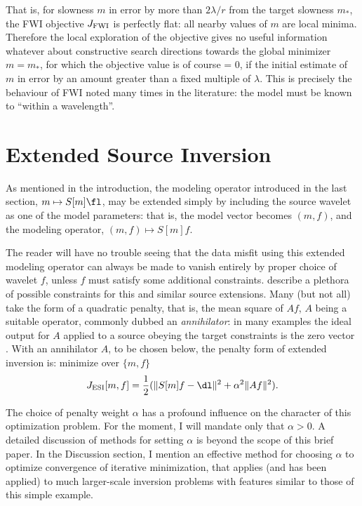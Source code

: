 That is, for slowness $m$ in error by more than $2\lambda/r$ from the
target slowness $m_*$, the FWI objective $J_{\rm FWI}$ is perfectly
flat: all nearby values of $m$ are local minima. Therefore the local
exploration of the objective
gives no useful information whatever about constructive search
directions towards the global minimizer $m=m_*$, for which the
objective value is of course = 0, if the initial estimate of $m$ in
error by an amount greater than a fixed multiple of $\lambda$. This is
precisely the behaviour of FWI noted many times in the literature: the
model must be known to ``within a wavelength''. 

\section{Extended Source Inversion}
As mentioned in the introduction, the modeling operator introduced in
the last section, $m \mapsto S[m]\fl$, may be extended simply by
including the source wavelet as one of the model parameters: that is,
the model vector becomes $(m,f)$, and the modeling operator, $(m,f)
\mapsto S[m]f$.

The reader will have no trouble seeing that the data misfit using this
extended modeling operator can always be made to vanish entirely by
proper choice of wavelet $f$, unless $f$ must satisfy some additional
constraints. \cite{HuangNammourSymesDollizal:SEG19} describe a
plethora of possible constraints for this and similar source
extensions. Many (but not all) take the form of a quadratic penalty,
that is, the mean square of $Af$, $A$ being a suitable operator,
commonly dubbed an {\em annihilator}: in many examples the ideal
output for $A$ applied to a source obeying the target constraints
is the zero vector \cite[]{geoprosp:2008}. With an annihilator $A$, to
be chosen below, the penalty form of extended inversion is: minimize
over $\{m,f\}$
\begin{equation}
\label{eqn:obj}
J_{\rm ESI}[m,f] = \frac{1}{2}(\|S[m]f-\dl\|^2 + \alpha^2 \|Af\|^2).
\end{equation}

The choice of penalty weight $\alpha$ has a profound influence on the
character of this optimization problem. For the moment, I will mandate
only that $\alpha > 0$. A detailed discussion of methods for setting
$\alpha$ is beyond the scope of this brief paper.  In the Discussion
section, I mention an effective method for choosing $\alpha$ to
optimize convergence of iterative minimization, that applies (and has
been applied) to much larger-scale inversion problems with features
similar to those of this simple example.

